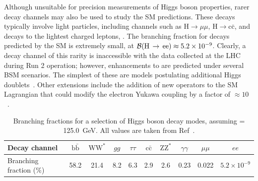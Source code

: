 Although unsuitable for precision measurements of Higgs boson properties, rarer decay channels may also be used to study the SM predictions. These decays typically involve light particles, including channels such as $\mathrm{H}\rightarrow\mu\mu$, $\mathrm{H}\rightarrow \mathrm{c}\bar{\mathrm{c}}$, and decays to the lightest charged leptons, \Hee. The branching fraction for \Hee decays predicted by the SM is extremely small, at $\mathcal{B}(\mathrm{H}\,\rightarrow\,\mathrm{ee}) \approx 5.2\times10^{-9}$. Clearly, a decay channel of this rarity is inaccessible with the data collected at the LHC during Run 2 operation; however, enhancements to \BHee are predicted under several BSM scenarios. The simplest of these are models postulating additional Higgs doublets~\cite{BSM_vecferm,BSM_2HDM}. Other extensions include the addition of new operators to the SM Lagrangian that could modify the electron Yukawa coupling by a factor of ${\approx}10$~\cite{dim_ten_operators}. 

\begin{table}[htbp!]
\centering
\caption[Branching fractions for selected Higgs boson decay modes, assuming \mH= 125.0~GeV.]{Branching fractions for a selection of Higgs boson decay modes, assuming \mH= 125.0~GeV. All values are taken from Ref~\cite{YR4}.}
\label{tab:higgs_decay_brs}
\begin{tabular}{l|ccccccccc}
\hline
Decay channel          & $\mathrm{b}\bar{\mathrm{b}}$ & $\mathrm{WW}^{*}$ & $gg$ & $\tau\tau$ & $\mathrm{c}\bar{\mathrm{c}}$ & $\mathrm{Z}\mathrm{Z}^{*}$ & $\gamma\gamma$ & $\mu\mu$ & $ee$ \\ \hline
Branching fraction (\%) & 58.2                        & 21.4    & 8.2  & 6.3       & 2.9       & 2.6     & 0.23           & 0.022     & $5.2\times10^{-9}$\\                                                                              
\hline
\end{tabular}                  
\end{table}  


